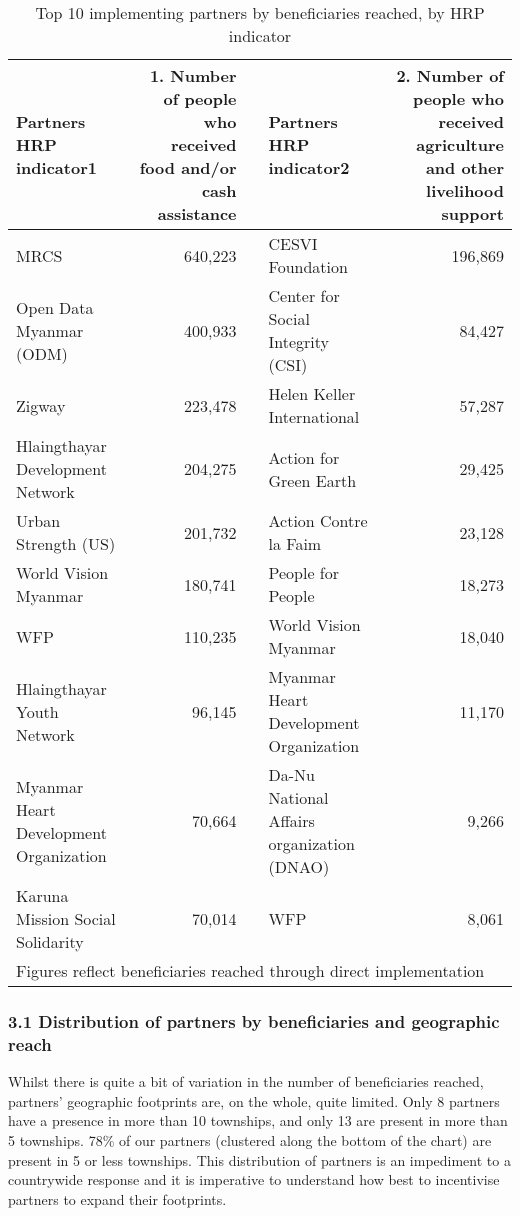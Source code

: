 \documentclass[
]{article}
\begin{document}
\begin{table}

\caption{\label{tab:table-top-partners-by-hrp-indicator}Top 10 implementing partners by beneficiaries reached, by HRP indicator}
\centering
\begin{tabular}[t]{l|r|l|l|r}
\hline
Partners HRP indicator1 & 1. Number of people who received food and/or cash assistance &   & Partners HRP indicator2 & 2. Number of people who received agriculture and other livelihood support\\
\hline
MRCS & 640,223 &  & CESVI Foundation & 196,869\\
\hline
Open Data Myanmar (ODM) & 400,933 &  & Center for Social Integrity (CSI) & 84,427\\
\hline
Zigway & 223,478 &  & Helen Keller International & 57,287\\
\hline
Hlaingthayar Development Network & 204,275 &  & Action for Green Earth & 29,425\\
\hline
Urban Strength (US) & 201,732 &  & Action Contre la Faim & 23,128\\
\hline
World Vision Myanmar & 180,741 &  & People for People & 18,273\\
\hline
WFP & 110,235 &  & World Vision Myanmar & 18,040\\
\hline
Hlaingthayar Youth Network & 96,145 &  & Myanmar Heart Development Organization & 11,170\\
\hline
Myanmar Heart Development Organization & 70,664 &  & Da-Nu National Affairs organization (DNAO) & 9,266\\
\hline
Karuna Mission Social Solidarity & 70,014 &  & WFP & 8,061\\
\hline
\multicolumn{5}{l}{\rule{0pt}{1em}Figures reflect beneficiaries reached through direct implementation}\\
\end{tabular}
\end{table}

\hypertarget{distribution-of-partners-by-beneficiaries-and-geographic-reach}{%
\subsubsection{3.1 Distribution of partners by beneficiaries and
geographic
reach}\label{distribution-of-partners-by-beneficiaries-and-geographic-reach}}

Whilst there is quite a bit of variation in the number of beneficiaries
reached, partners' geographic footprints are, on the whole, quite
limited. Only 8 partners have a presence in more than 10 townships, and
only 13 are present in more than 5 townships. 78\% of our partners
(clustered along the bottom of the chart) are present in 5 or less
townships. This distribution of partners is an impediment to a
countrywide response and it is imperative to understand how best to
incentivise partners to expand their footprints.
\end{document}
